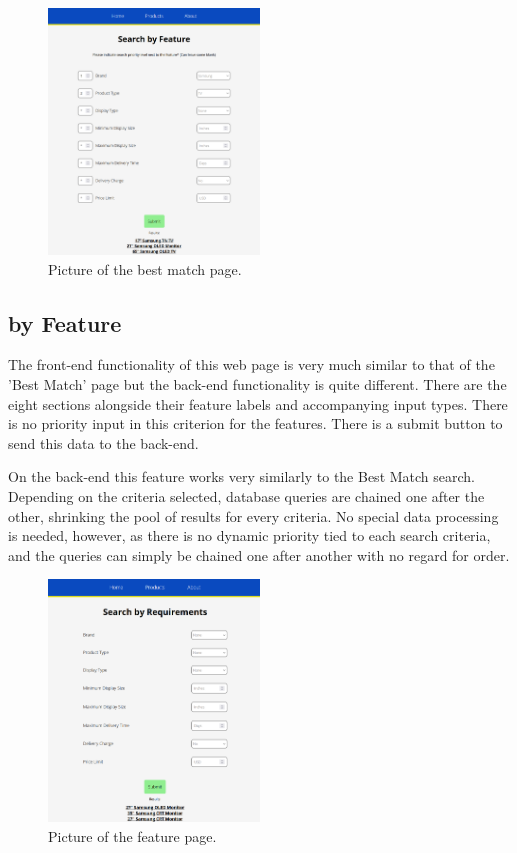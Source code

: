 \documentclass[sigconf]{acmart}
\begin{document}
\begin{figure}[H] %
	\centering %
	\includegraphics[width=0.5\textwidth]{Figures/bestmatch.png} %
	\caption{Picture of the best match page.}
\end{figure}

\subsection{by Feature}\label{feature}
The front-end functionality of this web page is very much similar to that of the 'Best Match' page but the back-end functionality is quite different. There are the eight sections alongside their feature labels and accompanying input types. There is no priority input in this criterion for the features. There is a submit button to send this data to the back-end. \par
On the back-end this feature works very similarly to the Best Match search. Depending on the criteria selected, database queries are chained one after the other, shrinking the pool of results for every criteria. No special data processing is needed, however, as there is no dynamic priority tied to each search criteria, and the queries can simply be chained one after another with no regard for order.

\begin{figure}[H] %
	\centering %
	\includegraphics[width=0.5\textwidth]{Figures/requirements.png} %
	\caption{Picture of the feature page.}
\end{figure}



\end{document}
